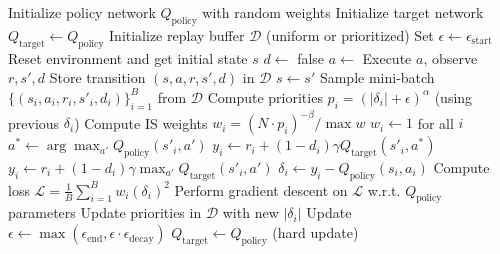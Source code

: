 \documentclass{IEEEtran}
\begin{document}
\begin{algorithm}[H]
\caption{Deep Q-Network Training with Optional Extensions}
\label{alg:dqn}
\begin{algorithmic}[1]
\State Initialize policy network $Q_{\text{policy}}$ with random weights
\State Initialize target network $Q_{\text{target}} \leftarrow Q_{\text{policy}}$
\State Initialize replay buffer $\mathcal{D}$ (uniform or prioritized)
\State Set $\epsilon \leftarrow \epsilon_{\text{start}}$
    \State Reset environment and get initial state $s$
    \State $d \leftarrow$ false
        \State $a \leftarrow$ 
        \State Execute $a$, observe $r, s', d$
        \State Store transition $(s, a, r, s', d)$ in $\mathcal{D}$
        \State $s \leftarrow s'$
            \State Sample mini-batch $\{(s_i, a_i, r_i, s'_i, d_i)\}_{i=1}^B$ from $\mathcal{D}$
                \State Compute priorities $p_i = (|\delta_i| + \epsilon)^{\alpha}$ (using previous $\delta_i$)
                \State Compute IS weights $w_i = (N \cdot p_i)^{-\beta} / \max w$
            \Else
                \State $w_i \leftarrow 1$ for all $i$
            \EndIf
                    \State $a^* \leftarrow \arg\max_{a'} Q_{\text{policy}}(s'_i, a')$
                    \State $y_i \leftarrow r_i + (1 - d_i) \gamma Q_{\text{target}}(s'_i, a^*)$
                \Else
                    \State $y_i \leftarrow r_i + (1 - d_i) \gamma \max_{a'} Q_{\text{target}}(s'_i, a')$
                \EndIf
                \State $\delta_i \leftarrow y_i - Q_{\text{policy}}(s_i, a_i)$
            \EndFor
            \State Compute loss $\mathcal{L} = \frac{1}{B} \sum_{i=1}^B w_i (\delta_i)^2$
            \State Perform gradient descent on $\mathcal{L}$ w.r.t. $Q_{\text{policy}}$ parameters
                \State Update priorities in $\mathcal{D}$ with new $|\delta_i|$
            \EndIf
        \EndIf
    \EndWhile
    \State Update $\epsilon \leftarrow \max(\epsilon_{\text{end}}, \epsilon \cdot \epsilon_{\text{decay}})$
        \State $Q_{\text{target}} \leftarrow Q_{\text{policy}}$ (hard update)
    \EndIf
\EndFor
\end{algorithmic}
\end{algorithm}
\end{document}
